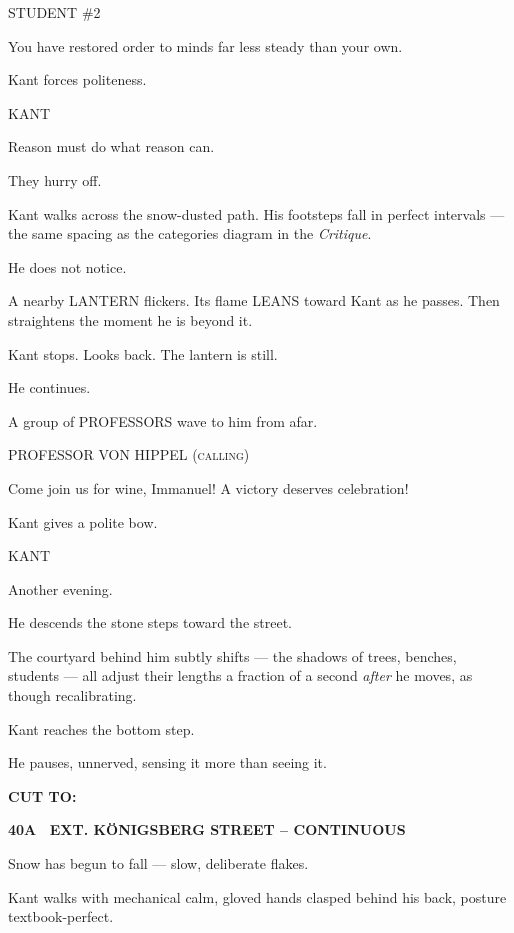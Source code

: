 \documentclass[12pt]{article}
\newcommand{\scene}[2]{%
  \vspace{1.8\baselineskip}%
  \noindent\textbf{#1 \ #2}\par\vspace{0.4\baselineskip}%
}
\newenvironment{dialogue}[1]{%
  \vspace{0.8\baselineskip}%
  \noindent\hspace*{2.3in}\textsc{#1}\par%
  \noindent\hspace*{1.5in}\begin{minipage}[t]{4.5in}%
}{%
  \end{minipage}\par%
}
\newcommand{\transition}[1]{%
  \vspace{0.6\baselineskip}%
  \begin{flushright}\textbf{#1}\end{flushright}%
}
\begin{document}
\begin{dialogue}{STUDENT \#2}
You have restored order to minds far less steady than your own.
\end{dialogue}

Kant forces politeness.

\begin{dialogue}{KANT}
Reason must do what reason can.
\end{dialogue}

They hurry off.

Kant walks across the snow-dusted path.  
His footsteps fall in perfect intervals —  
the same spacing as the categories diagram in the \emph{Critique}.

He does not notice.

A nearby LANTERN flickers.  
Its flame LEANS toward Kant as he passes.  
Then straightens the moment he is beyond it.

Kant stops. Looks back.  
The lantern is still.

He continues.

A group of PROFESSORS wave to him from afar.

\begin{dialogue}{PROFESSOR VON HIPPEL (calling)}
Come join us for wine, Immanuel!  
A victory deserves celebration!
\end{dialogue}

Kant gives a polite bow.

\begin{dialogue}{KANT}
Another evening.
\end{dialogue}

He descends the stone steps toward the street.

The courtyard behind him subtly shifts —  
the shadows of trees, benches, students —  
all adjust their lengths a fraction of a second \emph{after} he moves, as 
though recalibrating.

Kant reaches the bottom step.

He pauses, unnerved, sensing it more than seeing it.

\transition{CUT TO:}


\scene{40A}{EXT. KÖNIGSBERG STREET -- CONTINUOUS}

Snow has begun to fall — slow, deliberate flakes.

Kant walks with mechanical calm, gloved hands clasped behind his back, 
posture textbook-perfect.
\end{document}
